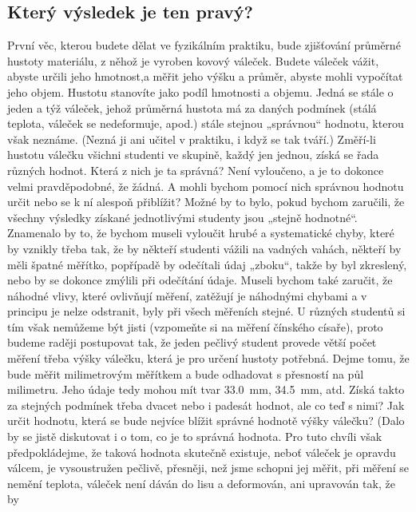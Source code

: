    \subsection{Který výsledek je ten pravý?}
      První věc, kterou budete dělat ve fyzikálním praktiku, bude zjišťování průměrné hustoty 
      materiálu, z něhož je vyroben kovový váleček. Budete váleček vážit, abyste určili jeho 
      hmotnost,a měřit jeho výšku a průměr, abyste mohli vypočítat jeho objem. Hustotu stanovíte 
      jako podíl hmotnosti a objemu. Jedná se stále o jeden a týž váleček, jehož průměrná hustota 
      má za daných podmínek (stálá teplota, váleček se nedeformuje, apod.) stále stejnou „správnou“ 
      hodnotu, kterou však neznáme. (Nezná ji ani učitel v praktiku, i když se tak tváří.) Změří-li 
      hustotu válečku všichni studenti ve skupině, každý jen jednou, získá se řada různých hodnot. 
      Která z nich je ta správná? Není vyloučeno, a je to dokonce velmi pravděpodobné, že žádná. A 
      mohli bychom pomocí nich správnou hodnotu určit nebo se k ní alespoň přiblížit? Možné by to 
      bylo, pokud bychom zaručili, že všechny výsledky získané jednotlivými studenty jsou „stejně 
      hodnotné“. Znamenalo by to, že bychom museli vyloučit hrubé a systematické chyby, které by 
      vznikly třeba tak, že by někteří studenti vážili na vadných vahách, někteří by měli špatné 
      měřítko, popřípadě by odečítali údaj „zboku“, takže by byl zkreslený, nebo by se dokonce 
      zmýlili při odečítání údaje. Museli bychom také zaručit, že náhodné vlivy, které ovlivňují 
      měření, zatěžují je náhodnými chybami a v principu je nelze odstranit, byly při všech 
      měřeních stejné. U různých studentů si tím však nemůžeme být jisti (vzpomeňte si na měření 
      čínského císaře), proto budeme raději postupovat tak, že jeden pečlivý student provede větší 
      počet měření třeba výšky válečku, která je pro určení hustoty potřebná. Dejme tomu, že bude 
      měřit milimetrovým měřítkem a bude odhadovat s přesností na půl milimetru. Jeho údaje tedy 
      mohou mít tvar \SI{33.0}{\mm}, \SI{34.5}{\mm}, atd. Získá takto za stejných podmínek třeba 
      dvacet nebo i padesát hodnot, ale co teď s nimi? Jak určit hodnotu, která se bude nejvíce 
      blížit správné hodnotě výšky válečku? (Dalo by se jistě diskutovat i o tom, co je to správná 
      hodnota. Pro tuto chvíli však předpokládejme, že taková hodnota skutečně existuje, neboť 
      váleček je opravdu válcem, je vysoustružen pečlivě, přesněji, než jsme schopni jej měřit, při 
      měření se nemění teplota, váleček není dáván do lisu a deformován, ani upravován tak, že by 
